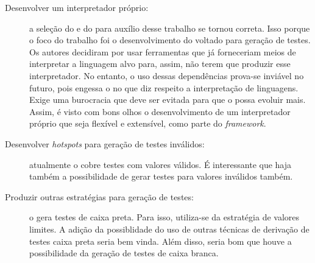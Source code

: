 \begin{description}
\item[Desenvolver um interpretador próprio:] a seleção do \flexcpp e do \bisoncpp para
auxílio desse trabalho se tornou correta. Isso porque o foco do trabalho foi o
desenvolvimento do \framework voltado para geração de testes. Os autores decidiram
por usar ferramentas que já forneceriam meios de interpretar a linguagem alvo para,
assim, não terem que produzir esse interpretador. No entanto, o uso dessas
dependências prova-se inviável no futuro, pois engessa o \framework no que diz
respeito a interpretação de linguagens. Exige uma burocracia que deve ser evitada
para que o \scarefault possa evoluir mais. Assim, é visto com bons olhos o
desenvolvimento de um interpretador próprio que seja flexível e extensível, como
parte do \textit{framework}.
\item[Desenvolver \textit{hotspots} para geração de testes inválidos:] atualmente
o \scarefault cobre testes com valores válidos. É interessante que haja também a
possibilidade de gerar testes para valores inválidos também.
\item[Produzir outras estratégias para geração de testes:] o \scarefault gera
testes de caixa preta. Para isso, utiliza-se da estratégia de valores limites. A
adição da possiblidade do uso de outras técnicas de derivação de testes caixa preta
seria bem vinda. Além disso, seria bom que houve a possibilidade da geração
de testes de caixa branca.
\end{description}
